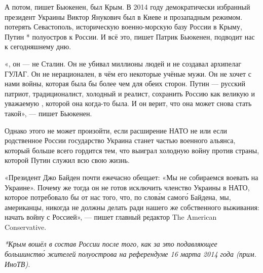 А потом, пишет Бьюкенен, был Крым. В 2014 году демократически избранный президент Украины Виктор Янукович был  в Киеве и  прозападным режимом.  потерять Севастополь, историческую военно-морскую базу России в Крыму, Путин * полуостров к России. И всё это, пишет Патрик Бьюкенен, подводит нас к сегодняшнему дню.

\begin{fancyquotes}
    «, он --- не Сталин. Он не убивал миллионы людей и не создавал архипелаг ГУЛАГ. Он не нерационален, в чём  его некоторые учёные мужи. Он не хочет с нами войны, которая была бы более чем  для обеих сторон. Путин --- русский патриот, традиционалист, холодный и  реалист,  сохранить Россию как великую и уважаемую , которой она когда-то была. И он верит, что она может снова стать такой», --- пишет Бьюкенен.
\end{fancyquotes}

Однако этого не может произойти, если расширение НАТО не  или если родственное России государство Украина станет частью военного альянса, который больше всего гордится тем, что выиграл холодную войну против страны, которой Путин служил всю свою жизнь.

\begin{fancyquotes}
    «Президент Джо Байден почти ежечасно обещает: «Мы не собираемся воевать на Украине». Почему же тогда он не готов исключить членство Украины в НАТО, которое потребовало бы от нас того, что, по слов\'{а}м самог\'{о} Байдена, мы, американцы, никогда не должны делать ради нашего же собственного выживания: начать войну с Россией», --- пишет главный редактор The American Conservative.
\end{fancyquotes}

\textit{*Крым вошёл в состав России после того, как за это  подавляющее большинств\'{о} жителей полуострова на референдуме 16 марта 2014 года (прим. ИноТВ).}




